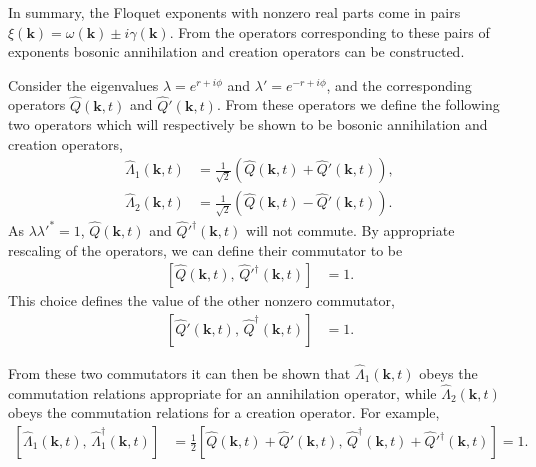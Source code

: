 In summary, the Floquet exponents with nonzero real parts come in pairs $\xi(\bm{k}) = \omega(\bm{k}) \pm i\gamma(\bm{k})$. From the operators corresponding to these pairs of exponents bosonic annihilation and creation operators can be constructed.

Consider the eigenvalues $\displaystyle \lambda = e^{r + i \phi}$ and $\displaystyle \lambda' = e^{-r + i\phi}$, and the corresponding operators $\hat{Q}(\bm{k}, t)$ and $\hat{Q}'(\bm{k}, t)$. From these operators we define the following two operators which will respectively be shown to be bosonic annihilation and creation operators,
\begin{align}
    \hat{\Lambda}_1(\bm{k}, t) &= \frac{1}{\sqrt{2}} \left( \hat{Q}(\bm{k}, t) + \hat{Q}'(\bm{k}, t)\right),\\
    \hat{\Lambda}_2(\bm{k}, t) &= \frac{1}{\sqrt{2}} \left( \hat{Q}(\bm{k}, t) - \hat{Q}'(\bm{k}, t)\right).
\end{align}
As $\lambda \lambda'^* = 1$, $\hat{Q}(\bm{k}, t)$ and $\hat{Q}'^\dagger(\bm{k}, t)$ will not commute. By appropriate rescaling of the operators, we can define their commutator to be
\begin{align}
    \left[ \hat{Q}(\bm{k}, t),\, \hat{Q}'^\dagger(\bm{k}, t) \right] &= 1.
\end{align}
This choice defines the value of the other nonzero commutator,
\begin{align}
    \left[ \hat{Q}'(\bm{k}, t),\, \hat{Q}^\dagger(\bm{k}, t) \right] &= 1.
\end{align}

From these two commutators it can then be shown that $\hat{\Lambda}_1(\bm{k}, t)$ obeys the commutation relations appropriate for an annihilation operator, while $\hat{\Lambda}_2(\bm{k}, t)$ obeys the commutation relations for a creation operator. For example,
\begin{align}
    \left[\hat{\Lambda}_1^{\phantom{\dagger}}(\bm{k}, t),\, \hat{\Lambda}_1^\dagger(\bm{k}, t) \right] &= \frac{1}{2} \left[ \hat{Q}(\bm{k}, t) + \hat{Q}'(\bm{k}, t),\, \hat{Q}^\dagger(\bm{k}, t) + \hat{Q}'^\dagger(\bm{k}, t)\right] = 1.
\end{align}

